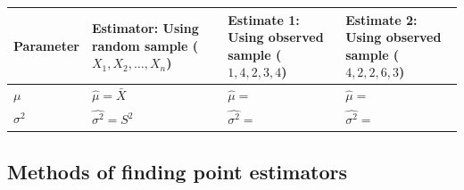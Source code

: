 \documentclass[]{book}
\begin{document}
\begin{longtable}[]{@{}llll@{}}
\toprule
\begin{minipage}[b]{0.21\columnwidth}\raggedright
Parameter\strut
\end{minipage} & \begin{minipage}[b]{0.23\columnwidth}\raggedright
Estimator: Using random sample (\(X_1, X_2, \dots, X_n\))\strut
\end{minipage} & \begin{minipage}[b]{0.25\columnwidth}\raggedright
Estimate 1: Using observed sample (\(1,4,2,3,4\))\strut
\end{minipage} & \begin{minipage}[b]{0.21\columnwidth}\raggedright
Estimate 2: Using observed sample (\(4,2,2,6,3\))\strut
\end{minipage}\tabularnewline
\midrule
\endhead
\begin{minipage}[t]{0.21\columnwidth}\raggedright
\(\mu\)\strut
\end{minipage} & \begin{minipage}[t]{0.23\columnwidth}\raggedright
\(\hat{\mu}=\bar{X}\)\strut
\end{minipage} & \begin{minipage}[t]{0.25\columnwidth}\raggedright
\(\hat{\mu}=\)\strut
\end{minipage} & \begin{minipage}[t]{0.21\columnwidth}\raggedright
\(\hat{\mu}=\)\strut
\end{minipage}\tabularnewline
\begin{minipage}[t]{0.21\columnwidth}\raggedright
\(\sigma^2\)\strut
\end{minipage} & \begin{minipage}[t]{0.23\columnwidth}\raggedright
\(\hat{\sigma^2}=S^2\)\strut
\end{minipage} & \begin{minipage}[t]{0.25\columnwidth}\raggedright
\(\hat{\sigma^2}=\)\strut
\end{minipage} & \begin{minipage}[t]{0.21\columnwidth}\raggedright
\(\hat{\sigma^2}=\)\strut
\end{minipage}\tabularnewline
\bottomrule
\end{longtable}

\hypertarget{methods-of-finding-point-estimators}{%
\subsection{Methods of finding point estimators}\label{methods-of-finding-point-estimators}}
\end{document}
